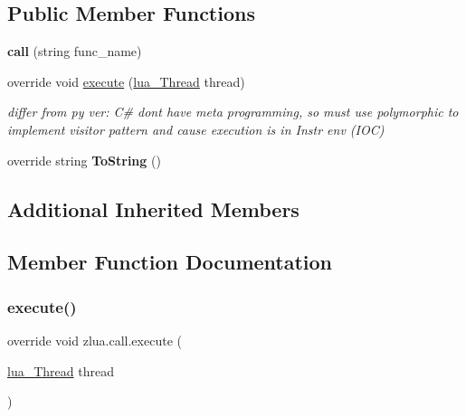 \subsection*{Public Member Functions}
\begin{DoxyCompactItemize}
\item 
\mbox{\label{classzlua_1_1call_ac974a41a36538851e46c0dabe29e1769}} 
{\bfseries call} (string func\+\_\+name)
\item 
override void \mbox{\hyperlink{classzlua_1_1call_a152a4ccd3e77e5172f97283a50d6ba45}{execute}} (\mbox{\hyperlink{classzlua_1_1lua___thread}{lua\+\_\+\+Thread}} thread)
\begin{DoxyCompactList}\small\item\em differ from py ver\+: C\# dont have meta programming, so must use polymorphic to implement visitor pattern and cause execution is in Instr env (I\+OC) \end{DoxyCompactList}\item 
\mbox{\label{classzlua_1_1call_a39377a59ffe57e46a5f7e930a50b4009}} 
override string {\bfseries To\+String} ()
\end{DoxyCompactItemize}
\subsection*{Additional Inherited Members}


\subsection{Member Function Documentation}
\mbox{\label{classzlua_1_1call_a152a4ccd3e77e5172f97283a50d6ba45}} 
\subsubsection{\texorpdfstring{execute()}{execute()}}
{\footnotesize\ttfamily override void zlua.\+call.\+execute (\begin{DoxyParamCaption}\item[{\mbox{\hyperlink{classzlua_1_1lua___thread}{lua\+\_\+\+Thread}}}]{thread }\end{DoxyParamCaption})\hspace{0.3cm}{\ttfamily [virtual]}}



